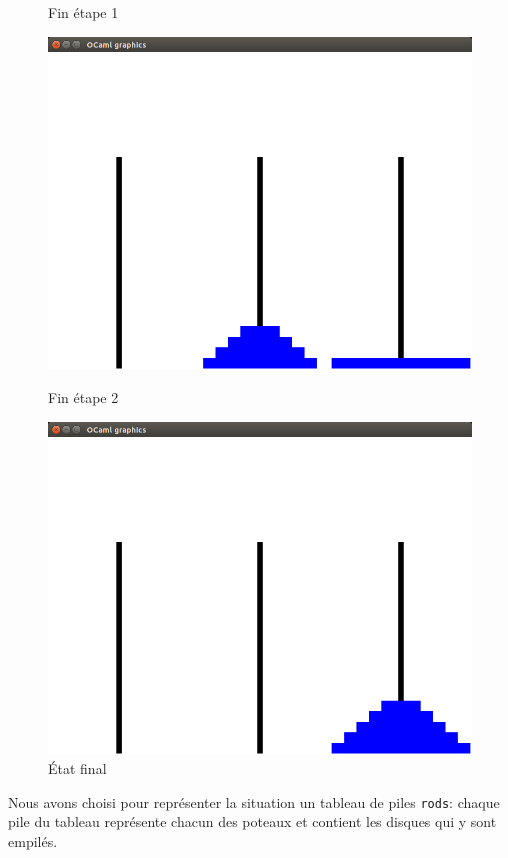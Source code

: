 \documentclass[a4paper, 11pt]{article}%
\begin{document}
\begin{figure}[!h]
			  \caption{Fin étape 1}\label{fig:hanoi_mid1}
			\endminipage\hfill
			  \includegraphics[width=\linewidth]{hanoi_mid2.png}
			  \caption{Fin étape 2}\label{fig:hanoi_mid2}
			\endminipage\hfill
			  \includegraphics[width=\linewidth]{hanoi_end.png}
			  \caption{État final}\label{fig:hanoi_end}
			\endminipage\hfill
		\end{figure}

		Nous avons choisi pour représenter la situation un tableau de piles
		\texttt{rods}: chaque pile du tableau représente chacun des poteaux et
		contient les disques qui y sont empilés.
\end{document}

